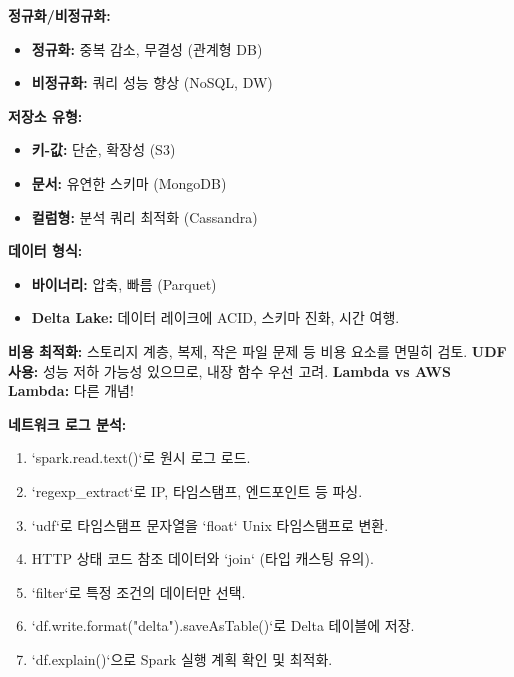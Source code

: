 \documentclass[11pt,a4paper]{article}
\begin{document}
\begin{tcolorbox}[conceptbox, title={데이터 저장소 및 형식}]
\textbf{정규화/비정규화:}
\begin{itemize}
    \item \textbf{정규화:} 중복 감소, 무결성 (관계형 DB)
    \item \textbf{비정규화:} 쿼리 성능 향상 (NoSQL, DW)
\end{itemize}
\textbf{저장소 유형:}
\begin{itemize}
    \item \textbf{키-값:} 단순, 확장성 (S3)
    \item \textbf{문서:} 유연한 스키마 (MongoDB)
    \item \textbf{컬럼형:} 분석 쿼리 최적화 (Cassandra)
\end{itemize}
\textbf{데이터 형식:}
\begin{itemize}
    \item \textbf{바이너리:} 압축, 빠름 (Parquet)
    \item \textbf{Delta Lake:} 데이터 레이크에 ACID, 스키마 진화, 시간 여행.
\end{itemize}
\end{tcolorbox}

\begin{tcolorbox}[warningbox, title={주의 사항}]
\textbf{비용 최적화:} 스토리지 계층, 복제, 작은 파일 문제 등 비용 요소를 면밀히 검토.
\textbf{UDF 사용:} 성능 저하 가능성 있으므로, 내장 함수 우선 고려.
\textbf{Lambda vs AWS Lambda:} 다른 개념!
\end{tcolorbox}

\begin{tcolorbox}[examplebox, title={실습 요약 (Lab 02)}]
\textbf{네트워크 로그 분석:}
\begin{enumerate}
    \item `spark.read.text()`로 원시 로그 로드.
    \item `regexp_extract`로 IP, 타임스탬프, 엔드포인트 등 파싱.
    \item `udf`로 타임스탬프 문자열을 `float` Unix 타임스탬프로 변환.
    \item HTTP 상태 코드 참조 데이터와 `join` (타입 캐스팅 유의).
    \item `filter`로 특정 조건의 데이터만 선택.
    \item `df.write.format("delta").saveAsTable()`로 Delta 테이블에 저장.
    \item `df.explain()`으로 Spark 실행 계획 확인 및 최적화.
\end{enumerate}
\end{tcolorbox}
\end{document}
